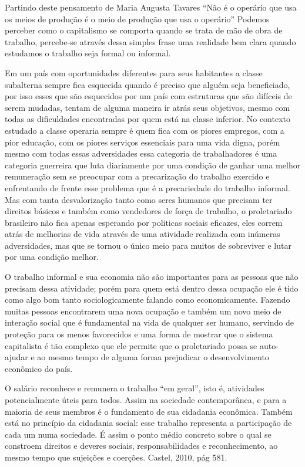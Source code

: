 Partindo deste pensamento de Maria Augusta Tavares “Não é o operário que usa os meios de produção é o meio de produção
que usa o operário” Podemos perceber como o capitalismo se comporta quando se trata de mão de obra de trabalho, 
percebe-se através dessa simples frase uma realidade bem clara quando estudamos o trabalho seja formal ou informal.

Em um país com oportunidades diferentes para seus habitantes a classe subalterna sempre fica esquecida quando é preciso
que alguém seja beneficiado, por isso esses que são esquecidos por um país com estruturas que são difíceis de serem 
mudadas, tentam de alguma maneira ir atrás seus objetivos, mesmo com todas as dificuldades encontradas por quem está
na classe inferior. No contexto estudado a classe operaria sempre é quem fica com os piores empregos, com a pior 
educação, com os piores serviços essenciais para uma vida digna, porém mesmo com todas essas adversidades essa categoria
de trabalhadores é uma categoria guerreira que luta diariamente por uma condição de ganhar uma melhor remuneração sem
se preocupar com a precarização do trabalho exercido e enfrentando de frente esse problema que é a precariedade do 
trabalho informal. Mas com tanta desvalorização tanto como seres humanos que precisam ter direitos básicos e também 
como vendedores de força de trabalho, o proletariado brasileiro não fica apenas esperando por politicas sociais eficazes,
eles correm atrás de melhorias de vida através de uma atividade realizada com inúmeras adversidades, mas que se tornou 
o único meio para muitos de sobreviver e lutar por uma condição melhor.

O trabalho informal e sua economia não são importantes para as pessoas que não precisam dessa atividade; porém para 
quem está dentro dessa ocupação ele é tido como algo bom tanto sociologicamente falando como economicamente. Fazendo
muitas pessoas encontrarem uma nova ocupação e também um novo meio de interação social que é fundamental na vida de 
qualquer ser humano, servindo de proteção para os menos favorecidos e uma forma de mostrar que o sistema capitalista 
é tão complexo que ele permite que o proletariado possa se auto-ajudar e ao mesmo tempo de alguma forma prejudicar o
desenvolvimento econômico do país. 

\begin{citacao}
O salário reconhece e remunera o trabalho “em geral”, isto é, atividades potencialmente úteis para todos. Assim na
sociedade contemporânea, e para a maioria de seus membros é o fundamento de sua cidadania econômica. Também está no
princípio da cidadania social: esse trabalho representa a participação de cada um numa sociedade. É assim o ponto 
médio concreto sobre o qual se constroem direitos e deveres sociais, responsabilidades e reconhecimento, ao mesmo 
tempo que sujeições e coerções. Castel, 2010, pág 581. 
\end{citacao}

